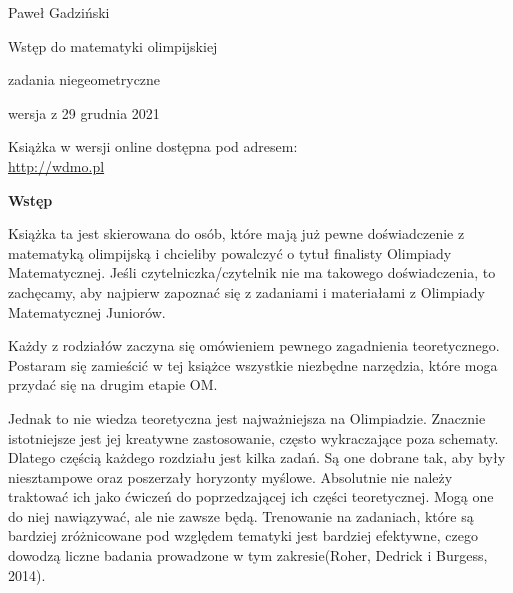 \thispagestyle{empty}\addtocounter{page}{-1}
	\begin{center}
		\fontsize{15}{15}\selectfont
		Paweł Gadziński

		\vspace{50px}

		\fontsize{40}{40}\selectfont
		\textcolor{kolor}{Wstęp do matematyki olimpijskiej}

		\vspace{20px}

		\fontsize{25}{25}\selectfont
		\textcolor{kolor}{zadania niegeometryczne}

		\vspace{40px}

		\fontsize{15}{15}\selectfont
		wersja z 29 grudnia 2021
	\end{center}
\vspace*{\fill}
\begin{center}
		\fontsize{15}{15}\selectfont
		Książka w wersji online dostępna pod adresem: \\
		\url{http://wdmo.pl}
\end{center}
\newpage
	\vspace*{\fill}
	\begin{center}
		\fontsize{20}{20}\selectfont
		\textbf{Wstęp}
		\vspace{30px}
	\end{center}
		\noindent
		Książka ta jest skierowana do osób, które mają już pewne doświadczenie z matematyką olimpijską i chcieliby powalczyć o tytuł finalisty Olimpiady Matematycznej. Jeśli czytelniczka/czytelnik nie ma takowego doświadczenia, to zachęcamy, aby najpierw zapoznać się z zadaniami i materiałami z Olimpiady Matematycznej Juniorów.

		\vspace{10px}
		\noindent
		Każdy z rodziałów zaczyna się omówieniem pewnego zagadnienia teoretycznego. Postaram się zamieścić w tej książce wszystkie niezbędne narzędzia, które moga przydać się na drugim etapie OM. 

		\vspace{10px}
		\noindent
		Jednak to nie wiedza teoretyczna jest najważniejsza na Olimpiadzie. Znacznie istotniejsze jest jej kreatywne zastosowanie, często wykraczające poza schematy. Dlatego częścią każdego rozdziału jest kilka zadań. Są one dobrane tak, aby były niesztampowe oraz poszerzały horyzonty myślowe. Absolutnie nie należy traktować ich jako ćwiczeń do poprzedzającej ich części teoretycznej. Mogą one do niej nawiązywać, ale nie zawsze będą. Trenowanie na zadaniach, które są bardziej zróżnicowane pod względem tematyki jest bardziej efektywne, czego dowodzą liczne badania prowadzone w tym zakresie(Roher, Dedrick i Burgess, 2014). 

